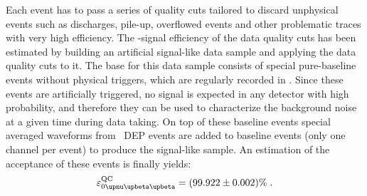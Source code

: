 Each event has to pass a series of quality cuts tailored to discard unphysical events such
as discharges, pile-up, overflowed events and other problematic traces with very high
efficiency. The \onbb-signal efficiency of the data quality cuts has been estimated by
building an artificial signal-like data sample and applying the data quality cuts to it.
The base for this data sample consists of special pure-baseline events without physical
triggers, which are regularly recorded in \gerda. Since these events are artificially
triggered, no signal is expected in any detector with high probability, and therefore they
can be used to characterize the background noise at a given time during data taking. On
top of these baseline events special averaged waveforms from \Th\ DEP events are added to
baseline events (only one channel per event) to produce the signal-like sample. An
estimation of the acceptance of these events is finally yields:
\[
  \epsilon_\onbbM^\text{QC} = (99.922 \pm 0.002)\% \;.
\]

